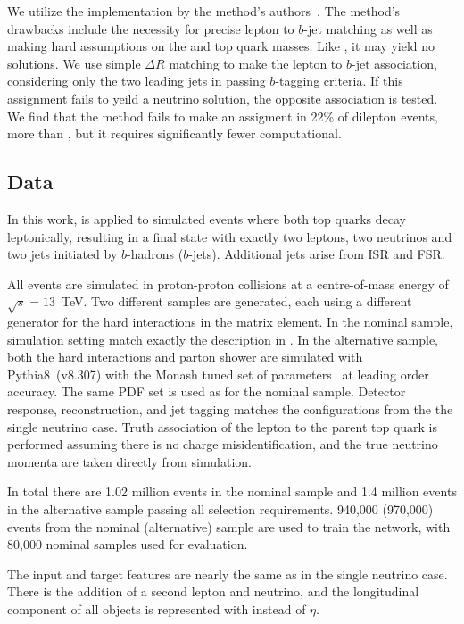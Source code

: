 We utilize the implementation by the method's authors~\cite{EllipseCode}.
The method's drawbacks include the necessity for precise lepton to $b$-jet matching as well as making hard assumptions on the \Wboson and top quark masses.
Like \vweight, it may yield no solutions.
We use simple $\Delta R$ matching to make the lepton to $b$-jet association, considering only the two leading jets in passing $b$-tagging criteria.
If this assignment fails to yeild a neutrino solution, the opposite association is tested.
We find that the method fails to make an assigment in 22\% of \ttbar dilepton events, more than \vweight, but it requires significantly fewer computational.

\subsection{Data}

In this work, \vvflows is applied to simulated \ttbar events where both top quarks decay leptonically, resulting in a final state with exactly two leptons, two neutrinos and two jets initiated by $b$-hadrons ($b$-jets).
Additional jets arise from ISR and FSR.

All events are simulated in proton-proton collisions at a centre-of-mass energy of \mbox{$\sqrt{s}=13$~TeV}.
Two different samples are generated, each using a different generator for the hard interactions in the matrix element.
In the nominal sample, simulation setting match exactly the description in .
In the alternative sample, both the hard interactions and parton shower are simulated with Pythia8~(v8.307) with the Monash tuned set of parameters~\cite{Monash} at leading order accuracy.
The same PDF set is used as for the nominal sample.
Detector response, reconstruction, and jet tagging matches the configurations from the the single neutrino case.
Truth association of the lepton to the parent top quark is performed assuming there is no charge misidentification, and the true neutrino momenta are taken directly from simulation.

In total there are 1.02 million events in the nominal sample and 1.4 million events in the alternative sample passing all selection requirements.
940,000 (970,000) events from the nominal (alternative) sample are used to train the network, with 80,000 nominal samples used for evaluation.

The input and target features are nearly the same as in the single neutrino case.
There is the addition of a second lepton and neutrino, and the longitudinal component of all objects is represented with \pz instead of $\eta$.

